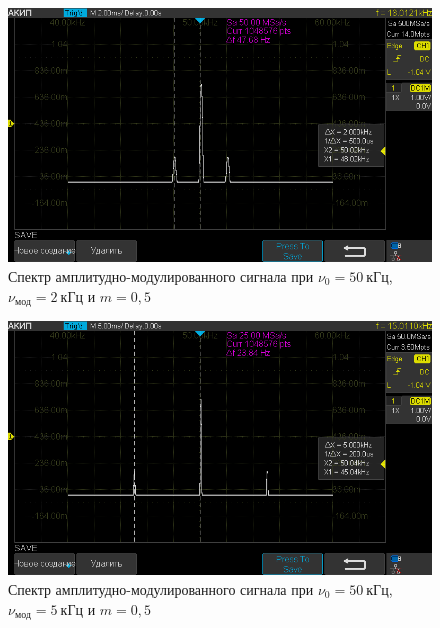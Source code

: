 \documentclass[a4paper, 12pt]{article}
\begin{document}
\begin{figure}[h!]
\begin{flushleft}
    \includegraphics[scale=0.5]{AKIP0015.png}
\end{flushleft}
\caption{Спектр амплитудно-модулированного сигнала при $\nu_0 = 50~кГц$, $\nu_{мод} = 2~кГц$ и $m = 0,5$}
\label{ris21}
\end{figure}

\begin{figure}[h!]
\begin{flushleft}
    \includegraphics[scale=0.5]{AKIP0016.png}
\end{flushleft}
\caption{Спектр амплитудно-модулированного сигнала при $\nu_0 = 50~кГц$, $\nu_{мод} = 5~кГц$ и $m = 0,5$}
\label{ris22}
\end{figure}
\end{document}
